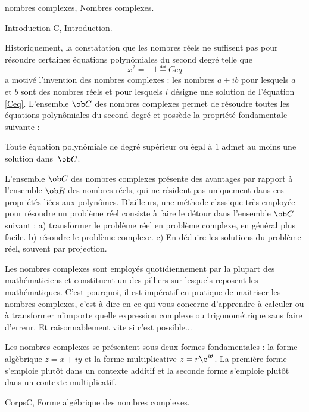 


\Chapter nombres complexes, Nombres complexes.

\Section Introduction C, Introduction. 

Historiquement, la constatation que les nombres réels ne suffisent pas pour résoudre certaines équations polynômiales 
du second degré telle que
$$
x^2=-1
\eqdef{Ceq}
$$ 
a motivé l'invention des nombres complexes : les nombres $a+ib$ pour lesquels $a$ et $b$ sont des nombres réels 
et pour lesquels $i$ désigne une solution de l'équation \eqref{Ceq}. 
\bigskip
L'ensemble $\ob C$ des nombres complexes permet de résoudre toutes les équations po\-ly\-nô\-mia\-les 
du second degré et possède la propriété fondamentale suivante : 

\Theoreme [Index=Theoreme@Théorème!de d'Alembert;Title=Théorème de d'Alembert-Gauss] 
Toute équation polynômiale de degré supérieur ou égal à $1$ admet au moins une solution dans~$\ob C$. 

L'ensemble $\ob C$ des nombres complexes présente des avantages par rapport à l'ensemble $\ob R$ des nombres réels, 
qui ne résident pas uniquement dans ces propriétés liées aux polynômes. D'ailleurs, une méthode classique très employée pour résoudre un problème réel consiste à faire le détour dans l'ensemble $\ob C$ suivant : \medskip
 \noindent
a) transformer le problème réel en problème complexe, en général plus facile. 
\smallskip\noindent
b) résoudre le problème complexe. 
\smallskip\noindent
c) En déduire les solutions du problème réel, souvent par projection. 
\bigskip

Les nombres complexes sont employés quotidiennement par la plupart des ma\-thé\-ma\-ti\-ciens et constituent un des pilliers sur lesquels reposent les mathématiques. 
C'est pourquoi, il est impératif en pratique de maitriser les nombres complexes, c'est à dire en ce qui vous concerne d'apprendre à calculer ou à transformer n'importe quelle expression complexe ou trigonométrique sans faire d'erreur. Et raisonnablement vite si c'est possible...

Les nombres complexes se présentent sous deux formes fondamentales : la forme al\-gè\-bri\-que $z=x+iy$ 
et la forme multiplicative $z=r\e^{i\theta}$. La première forme s'emploie plutôt dans un contexte additif 
et la seconde forme s'emploie plutôt dans un contexte multiplicatif. 



\Section CorpsC, Forme algébrique des nombres complexes. 


